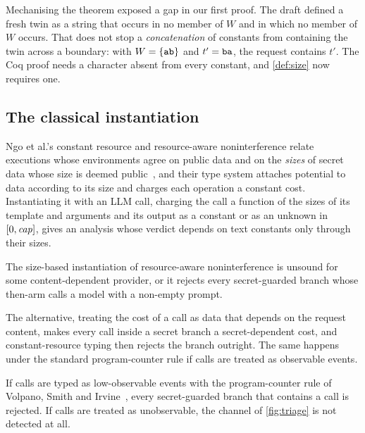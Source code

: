 Mechanising the theorem exposed a gap in our first proof. The draft defined a
fresh twin as a string that occurs in no member of $W$ and in which no member of
$W$ occurs. That does not stop a \emph{concatenation} of constants from containing
the twin across a boundary: with $W = \{\texttt{ab}\}$ and $t' = \texttt{ba}$, the
request  contains $t'$. The Coq proof needs a character absent from every
constant, and \cref{def:size} now requires one.

\subsection{The classical instantiation}\label{sec:classical}

Ngo et al.'s constant resource and resource-aware noninterference relate
executions whose environments agree on public data and on the \emph{sizes} of
secret data whose size is deemed public~\cite[Definitions 1 and 2]{ngo2017verifying},
and their type system attaches potential to data according to its size and charges
each operation a constant cost. Instantiating it with an LLM call,
charging the call a function of the sizes of its template and arguments and its
output as a constant or as an unknown in $[0, \mathit{cap}]$, gives an analysis whose
verdict depends on text constants only through their sizes.

\begin{corollary}\label{cor:classical}
The size-based instantiation of resource-aware noninterference is unsound for some
content-dependent provider, or it rejects every secret-guarded branch whose
then-arm calls a model with a non-empty prompt.
\end{corollary}

The alternative, treating the cost of a call as data that depends on the request
content, makes every call inside a secret branch a secret-dependent cost, and
constant-resource typing then rejects the branch outright. The same happens under
the standard program-counter rule if calls are treated as observable events.

\begin{proposition}\label{prop:pc}
If calls are typed as low-observable events with the program-counter rule of
Volpano, Smith and Irvine~\cite{volpano1996sound}, every secret-guarded branch that
contains a call is rejected. If calls are treated as unobservable, the channel of
\cref{fig:triage} is not detected at all.
\end{proposition}

